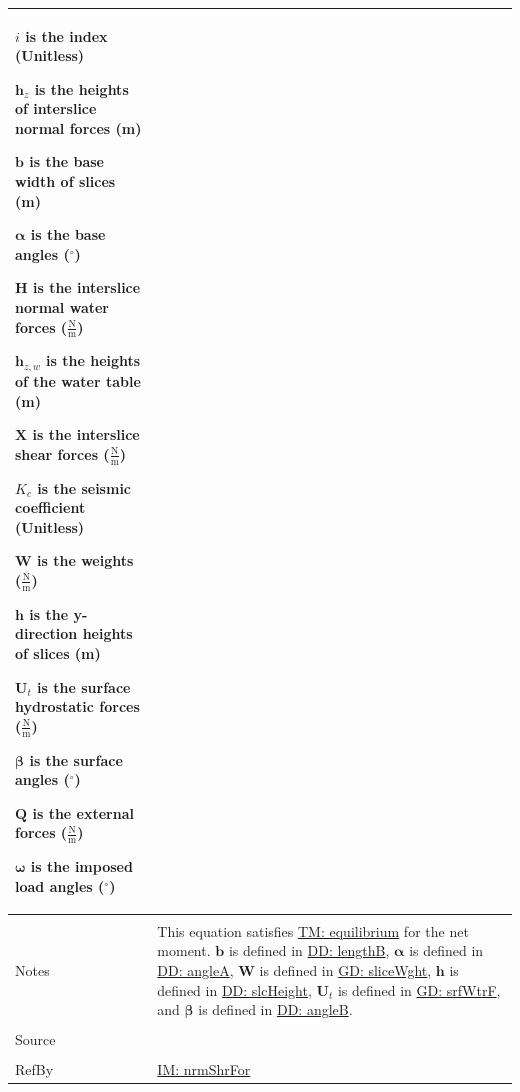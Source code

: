 \documentclass[12pt]{article}
\begin{document}
\begin{minipage}{\textwidth}
\begin{tabular}{>{\raggedright}p{}>{\raggedright\arraybackslash}p{}}
\begin{symbDescription}
                        \item{$i$ is the index (Unitless)}
                        \item{${\mathbf{h}_{z}}$ is the heights of interslice normal forces (m)}
                        \item{$\mathbf{b}$ is the base width of slices (m)}
                        \item{$\mathbf{α}$ is the base angles (${}^{\circ}$)}
                        \item{$\mathbf{H}$ is the interslice normal water forces ($\frac{\text{N}}{\text{m}}$)}
                        \item{${\mathbf{h}_{z,w}}$ is the heights of the water table (m)}
                        \item{$\mathbf{X}$ is the interslice shear forces ($\frac{\text{N}}{\text{m}}$)}
                        \item{${K_{c}}$ is the seismic coefficient (Unitless)}
                        \item{$\mathbf{W}$ is the weights ($\frac{\text{N}}{\text{m}}$)}
                        \item{$\mathbf{h}$ is the y-direction heights of slices (m)}
                        \item{${\mathbf{U}_{t}}$ is the surface hydrostatic forces ($\frac{\text{N}}{\text{m}}$)}
                        \item{$\mathbf{β}$ is the surface angles (${}^{\circ}$)}
                        \item{$\mathbf{Q}$ is the external forces ($\frac{\text{N}}{\text{m}}$)}
                        \item{$\mathbf{ω}$ is the imposed load angles (${}^{\circ}$)}
                        \end{symbDescription}
          \\ \midrule \\
          Notes & This equation satisfies \hyperref[TM:equilibrium]{TM: equilibrium} for the net moment. $\mathbf{b}$ is defined in \hyperref[DD:lengthB]{DD: lengthB}, $\mathbf{α}$ is defined in \hyperref[DD:angleA]{DD: angleA}, $\mathbf{W}$ is defined in \hyperref[GD:sliceWght]{GD: sliceWght}, $\mathbf{h}$ is defined in \hyperref[DD:slcHeight]{DD: slcHeight}, ${\mathbf{U}_{t}}$ is defined in \hyperref[GD:srfWtrF]{GD: srfWtrF}, and $\mathbf{β}$ is defined in \hyperref[DD:angleB]{DD: angleB}.
          \\ \midrule \\
          Source & \cite{chen2005}
          \\ \midrule \\
          RefBy & \hyperref[IM:nrmShrFor]{IM: nrmShrFor}
          \\ \bottomrule
          \end{tabular}
          \end{minipage}
\end{document}
